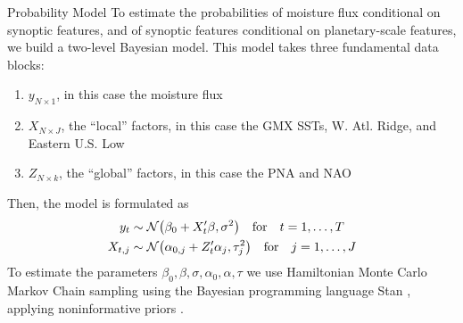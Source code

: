 \begin{block}{Probability Model}
    To estimate the  probabilities of moisture flux conditional on synoptic features, and of synoptic features conditional on planetary-scale features, we build a two-level Bayesian model.
    This model takes three fundamental data blocks:
    \begin{enumerate}
        \item $y_{N \times 1}$, in this case the moisture flux
        \item $X_{N \times J}$, the ``local'' factors, in this case the GMX SSTs, W. Atl. Ridge, and Eastern U.S. Low
        \item $Z_{N \times k}$, the ``global'' factors, in this case the PNA and NAO
    \end{enumerate}
    Then, the model is formulated as
    \begin{align}
        y_t & \sim \normal \qty(\beta_0 + X'_t \beta, \sigma^2) \qqtext{for} t = 1, \ldots, T \label{eq:yX}\\
        X_{t,j} &\sim \normal \qty(\alpha_{0,j} + Z'_t \alpha_j, \tau_j^2) \qqtext{for} j = 1, \ldots, J \label{eq:XZ}
    \end{align}
    To estimate the parameters $\beta_0, \beta, \sigma, \alpha_0, \alpha, \tau$ we use Hamiltonian Monte Carlo Markov Chain sampling using the Bayesian programming language Stan \cite{Carpenter2016}, applying noninformative priors \cite{Gelman2014}.
\end{block}
